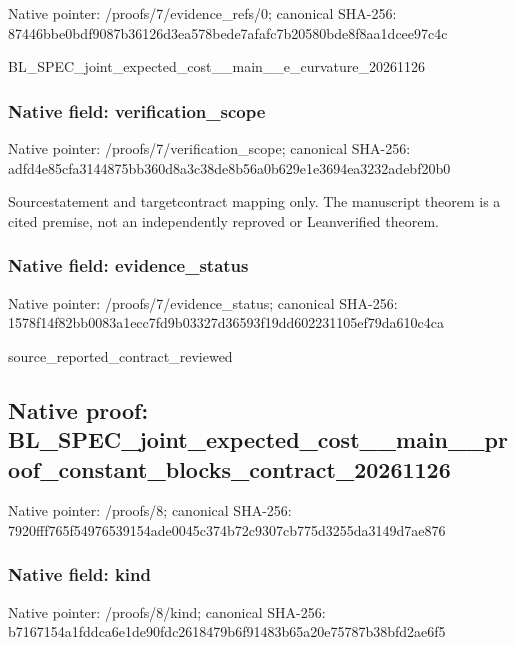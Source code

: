 \documentclass[10pt,a4paper]{article}
\begin{document}
Native pointer: /proofs/7/evidence\_refs/0; canonical SHA-256: 87446bbe0bdf9087b36126d3\allowbreak{}ea578bede7afafc7b20580bd\allowbreak{}e8f8aa1dcee97c4c


BL\_SPEC\_joint\_expected\_c\allowbreak{}ost\_\_main\_\_e\_curvature\_2\allowbreak{}0261126


\subsubsection{Native field: verification\_scope}


Native pointer: /proofs/7/verification\_scope; canonical SHA-256: adfd4e85cfa3144875bb360d\allowbreak{}8a3c38de8b56a0b629e1e369\allowbreak{}4ea3232adebf20b0


Sourcestatement and targetcontract mapping only. The manuscript theorem is a cited premise, not an independently reproved or Leanverified theorem.


\subsubsection{Native field: evidence\_status}


Native pointer: /proofs/7/evidence\_status; canonical SHA-256: 1578f14f82bb0083a1ecc7fd\allowbreak{}9b03327d36593f19dd602231\allowbreak{}105ef79da610c4ca


source\_reported\_contract\_reviewed


\subsection{Native proof: BL\_SPEC\_joint\_expected\_c\allowbreak{}ost\_\_main\_\_proof\_constan\allowbreak{}t\_blocks\_contract\_202611\allowbreak{}26}


Native pointer: /proofs/8; canonical SHA-256: 7920fff765f54976539154ad\allowbreak{}e0045c374b72c9307cb775d3\allowbreak{}255da3149d7ae876



\subsubsection{Native field: kind}


Native pointer: /proofs/8/kind; canonical SHA-256: b7167154a1fddca6e1de90fd\allowbreak{}c2618479b6f91483b65a20e7\allowbreak{}5787b38bfd2ae6f5
\end{document}
